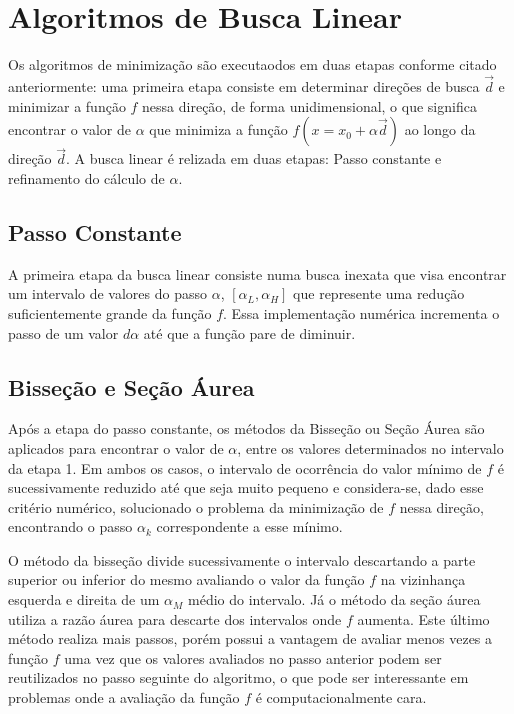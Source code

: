 \documentclass[10pt, a4paper]{article}
\begin{document}
\section{Algoritmos de Busca Linear}

Os algoritmos de minimiza\c c\~ao s\~ao executaodos em duas etapas conforme citado anteriormente: uma primeira etapa consiste em determinar dire\c c\~oes de busca $\vec{d}$ e minimizar a fun\c c\~ao $f$ nessa dire\c c\~ao, de forma unidimensional, o que significa encontrar o valor de  $\alpha$ que minimiza a fun\c c\~ao $f(x=x_{0}+\alpha\vec{d})$ ao longo da dire\c c\~ao $\vec{d}$. A busca linear \'e relizada em duas etapas: Passo constante e refinamento do c\'alculo de $\alpha$.

\subsection{Passo Constante}

A primeira etapa da busca linear consiste numa busca inexata que visa encontrar um intervalo de valores do passo $\alpha$, $[\alpha_{L}, \alpha_{H}]$ que represente uma redu\c c\~ao suficientemente grande da fun\c c\~ao $f$. Essa implementa\c c\~ao num\'erica incrementa o passo de um valor $d\alpha$ at\'e que a fun\c c\~ao pare de diminuir.

\subsection{Bisse\c c\~ao e Se\c c\~ao \'Aurea}

Ap\'os a etapa do passo constante, os m\'etodos da Bisse\c c\~ao ou Se\c c\~ao \'Aurea s\~ao aplicados para encontrar o valor de $\alpha$, entre os valores determinados no intervalo da etapa 1. Em ambos os casos, o intervalo de ocorr\^encia do valor m\'inimo de $f$ \'e sucessivamente reduzido at\'e que seja muito pequeno e considera-se, dado esse crit\'erio num\'erico, solucionado o problema da minimiza\c c\~ao de $f$ nessa dire\c c\~ao, encontrando o passo $\alpha_{k}$ correspondente a esse m\'inimo.

O m\'etodo da bisse\c c\~ao divide sucessivamente o intervalo descartando a parte superior ou inferior do mesmo avaliando o valor da fun\c c\~ao $f$ na vizinhan\c ca esquerda e direita de um $\alpha_{M}$ m\'edio do intervalo. J\'a o m\'etodo da se\c c\~ao \'aurea utiliza a raz\~ao \'aurea para descarte dos intervalos onde $f$ aumenta. Este \'ultimo m\'etodo realiza mais passos, por\'em possui a vantagem de avaliar menos vezes a fun\c c\~ao $f$ uma vez que os valores avaliados no passo anterior podem ser reutilizados no passo seguinte do algoritmo, o que pode ser interessante em problemas onde a avalia\c c\~ao da fun\c c\~ao $f$ \'e computacionalmente cara.
\end{document}
